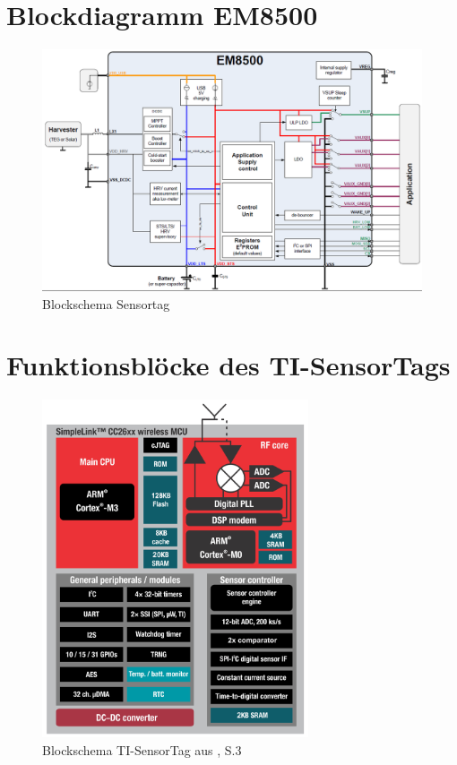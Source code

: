 \chapter{Blockdiagramm EM8500}\label{anhang_em8500} 
\begin{figure}[h]
    \includegraphics [width=1\textwidth]{7Anhang/imag/blockdiagrammEm8500.png} 
     \caption{Blockschema Sensortag}
\end{figure}



\chapter{Funktionsblöcke des TI-SensorTags}\label{anhang_sensortag} 


\begin{figure}[h]
    \includegraphics [width=0.7\textwidth]{7Anhang/imag/CC26xx_Block_Diagram.png} 
     \caption{Blockschema TI-SensorTag aus \cite{Sensortag_Datasheet}, S.3}
\end{figure}


